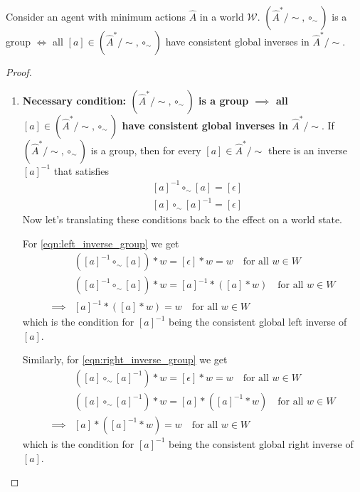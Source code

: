 \begin{proposition}
    Consider an agent with minimum actions $\hat{A}$ in a world $\mathscr{W}$.
    $(\hat{A}^{*}/\sim, \circ_{\sim})$ is a group $\iff$ all $[a] \in (\hat{A}^{*}/\sim, \circ_{\sim})$ have consistent global inverses in $\hat{A}^{*}/\sim$.
\end{proposition}
\begin{proof}
\begin{enumerate}[(1)]
    \item \textbf{Necessary condition: $(\hat{A}^{*}/\sim, \circ_{\sim})$ is a group $\implies$ all $[a] \in (\hat{A}^{*}/\sim, \circ_{\sim})$ have consistent global inverses in $\hat{A}^{*}/\sim$}.
    If $(\hat{A}^{*}/\sim, \circ_{\sim})$ is a group, then for every $[a] \in \hat{A}^{*}/\sim$ there is an inverse $[a]^{-1}$ that satisfies
    \begin{align}
        & [a]^{-1} \circ_{\sim} [a] = [\epsilon]
        \label{eqn:left_inverse_group}\\
        & [a] \circ_{\sim} [a]^{-1} = [\epsilon]
        \label{eqn:right_inverse_group}
    \end{align}
    Now let's translating these conditions back to the effect on a world state.
    
    For \cref{eqn:left_inverse_group} we get
    \begin{align}
        & ([a]^{-1} \circ_{\sim} [a]) \ast w = [\epsilon] \ast w = w \quad \text{for all $w \in W$} \\
        & ([a]^{-1} \circ_{\sim} [a]) \ast w = [a]^{-1} \ast ([a] \ast w) \quad \text{for all $w \in W$} \\
        \implies & [a]^{-1} \ast ([a] \ast w) = w \quad \text{for all $w \in W$}
    \end{align}
    which is the condition for $[a]^{-1}$ being the consistent global left inverse of $[a]$.
    
    Similarly, for \cref{eqn:right_inverse_group} we get
    \begin{align}
        & ([a] \circ_{\sim} [a]^{-1}) \ast w = [\epsilon] \ast w = w \quad \text{for all $w \in W$} \\
        & ([a] \circ_{\sim} [a]^{-1}) \ast w = [a] \ast ([a]^{-1} \ast w) \quad \text{for all $w \in W$} \\
        \implies & [a] \ast ([a]^{-1} \ast w) = w \quad \text{for all $w \in W$}
    \end{align}
    which is the condition for $[a]^{-1}$ being the consistent global right inverse of $[a]$.


\end{enumerate}
\end{proof}
